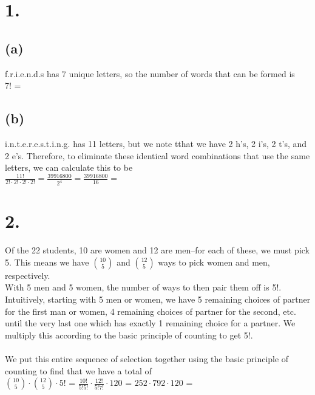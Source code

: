 \documentclass{article}
\begin{document}
\thispagestyle{firstpageheader}

\section*{1.}
{\Large 

\subsection*{(a)}

f.r.i.e.n.d.s has 7 unique letters, so the number of words that can be formed is \\
7! = 

\subsection*{(b)}

i.n.t.e.r.e.s.t.i.n.g. has 11 letters, but we note tthat we have 2 h's, 2 i's, 2 t's, and 2 e's. Therefore, to eliminate these identical word combinations that use the same letters, we can calculate this to be \\
$\frac{11!}{2! \cdot 2! \cdot 2! \cdot 2!} = \frac{39916800}{2^4} = \frac{39916800}{16} = $ 

}

\section*{2.}
{\Large

Of the 22 students, 10 are women and 12 are men--for each of these, we must pick 5. This means we have $\binom{10}{5}$ and $\binom{12}{5}$ ways to pick women and men, respectively. \\ With 5 men and 5 women, the number of ways to then pair them off is 5!. Intuitively, starting with 5 men or women, we have 5 remaining choices of partner for the first man or women, 4 remaining choices of partner for the second, etc. until the very last one which has exactly 1 remaining choice for a partner. We multiply this according to the basic principle of counting to get 5!.\\ \\
We put this entire sequence of selection together using the basic principle of counting to find that we have a total of \\
$\binom{10}{5} \cdot \binom{12}{5} \cdot 5!$ = $\frac{10!}{5!5!} \cdot \frac{12!}{5!7!} \cdot 120$ = $252 \cdot 792 \cdot 120$ = 

}
\end{document}
